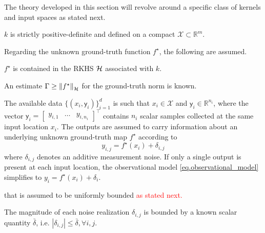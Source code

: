 The theory developed in this section will revolve around a specific class of kernels and input spaces as stated next.

\begin{assumption}
	\label{as:kernel_spd_compact_X}
	 $k$ is strictly positive-definite and defined on a compact $\mathcal{X} \subset \mathbb{R}^m$.
\end{assumption}

Regarding the unknown ground-truth function $f^\star$, the following are assumed.

\begin{assumption}
	\label{as:rkhs_contains_gt}
	$f^\star$ is contained in the RKHS $\mathcal{H}$ associated with $k$.
\end{assumption}

\begin{assumption}
	An estimate $\Gamma \geq \left\| f^\star \right\|_\mathcal{H}$ for the ground-truth norm is known.
\end{assumption}


The available data $\{(x_i,\mathsf{y}_i)\}_{i=1}^d$ is such that $x_i \in \mathcal{X}$ and $\mathsf{y}_i \in \mathbb{R}^{n_i}$, where the vector $\mathsf{y}_i = \begin{bmatrix}y_{i,1} & \dots & y_{i,n_i} \end{bmatrix}^\top$ contains $n_i$ scalar samples collected at the same input location $x_i$. The outputs are assumed to carry information about an underlying unknown ground-truth map $f^\star$ according to
\begin{equation}
	\label{eq.observational_model}
	y_{i,j} = f^\star(x_i) + \delta_{i,j}
\end{equation}
where $\delta_{i,j}$ denotes an additive measurement noise. If only a single output is present at each input location, the observational model \eqref{eq.observational_model} simplifies to $y_{i} = f^\star(x_i) + \delta_{i}$.

 that is assumed to be uniformly bounded \textcolor{red}{as stated next.}

\begin{assumption}
	\label{as:noisebound}
	The magnitude of each noise realization $\delta_{i,j}$ is bounded by a known scalar quantity $\bar{\delta}$, i.e. $|\delta_{i,j}| \leq \bar \delta, \forall i,j$.
\end{assumption}

